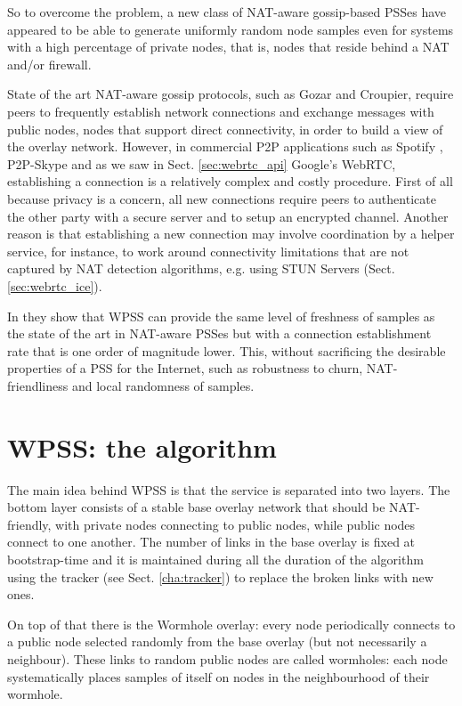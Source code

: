 So to overcome the problem, a new class of NAT-aware gossip-based PSSes have appeared to be able to generate uniformly random node samples even for systems with a high percentage of private nodes, that is, nodes that reside behind a NAT and/or firewall.

State of the art NAT-aware gossip protocols, such as Gozar \cite{gozar} and Croupier\cite{croupier}, require peers to frequently establish network connections and exchange messages with public nodes, nodes that support direct connectivity, in order to build a view of the overlay network. However, in commercial P2P applications such as Spotify \cite{spotify}, P2P-Skype \cite{skype} and as we saw in Sect. \ref{sec:webrtc_api} Google’s WebRTC, establishing a connection is a relatively complex and costly procedure. First of all because privacy is a concern, all new connections require peers to authenticate the other party with a secure server and to setup an encrypted channel. Another reason is that establishing a new connection may involve coordination by a helper service, for instance, to work around connectivity limitations that are not captured by NAT detection algorithms, e.g. using STUN Servers (Sect. \ref{sec:webrtc_ice}). 

In \cite{wormhole} they show that WPSS can provide the same level of freshness of samples as the state of the art in NAT-aware PSSes \cite{croupier} but with a connection establishment rate that is one order of magnitude lower. This, without sacrificing the desirable properties of a PSS for the Internet, such as robustness to churn, NAT-friendliness and local randomness of samples.

\section{WPSS: the algorithm}
\label{sec:wpss_algorithm}
The main idea behind WPSS is that the service is separated into two layers. The bottom layer consists of a stable base overlay network that should be NAT-friendly, with private nodes connecting to public nodes, while public nodes connect to one another. The number of links in the base overlay is fixed at bootstrap-time and it is maintained during all the duration of the algorithm using the tracker (see Sect. \ref{cha:tracker}) to replace the broken links with new ones.

On top of that there is the Wormhole overlay: every node periodically connects to a public node selected randomly from the base overlay (but not necessarily a neighbour). These links to random public nodes are called wormholes: each node systematically places samples of itself on nodes in the neighbourhood of their wormhole. 


